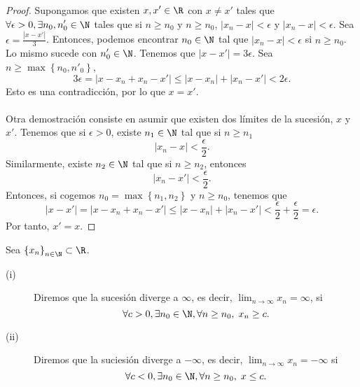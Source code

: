 \begin{proof}
	Supongamos que existen $\displaystyle x, x' \in \R $ con $\displaystyle x \neq x' $ tales que $\displaystyle \forall \epsilon > 0, \exists n_{0}, n'_{0} \in \N $ tales que si $\displaystyle n \geq n_{0}$ y $ n \geq n_{0} $, $\displaystyle \left|x_{n}-x\right| < \epsilon  $ y $\displaystyle \left|x_{n}-x\right|<\epsilon  $. Sea $\displaystyle \epsilon = \frac{ \left|x - x'\right|}{3} $. Entonces, podemos encontrar $\displaystyle n_{0} \in \N $ tal que $\displaystyle  \left|x_{n}-x\right| < \epsilon  $ si $\displaystyle n \geq n_{0} $. Lo mismo sucede con $\displaystyle n'_{0} \in \N $. Tenemos que $\displaystyle \left|x-x'\right| = 3 \epsilon $. Sea $\displaystyle n \geq \max \left\{ n_{0}, n'_{0}\right\}  $, 
	\[ 3 \epsilon = \left|x - x_{n} + x_{n}-x'\right| \leq \left|x - x_{n}\right| + \left|x_{n}-x'\right| < 2\epsilon .\]
	Esto es una contradicción, por lo que $\displaystyle x = x' $. \\ \\
Otra demostración consiste en asumir que existen dos límites de la sucesión, $\displaystyle x $ y $\displaystyle x' $. Tenemos que si $\displaystyle \epsilon > 0 $, existe $\displaystyle n_{1} \in \N $ tal que si $\displaystyle n \geq n_{1} $ 
\[ \left|x_{n}-x\right| < \frac{\epsilon }{2} .\]
Similarmente, existe $\displaystyle n_{2}\in\N $ tal que si $\displaystyle n \geq n_{2} $, entonces 
\[ \left|x_{n}-x'\right| < \frac{\epsilon }{2} .\]
Entonces, si cogemos $\displaystyle n_{0} = \max \left\{ n_{1}, n_{2}\right\}  $ y $\displaystyle n \geq n_{0} $, tenemos que 
\[ \left|x - x'\right| = \left|x - x_{n} + x_{n}- x'\right| \leq \left|x - x_{n}\right| + \left|x_{n}-x'\right| < \frac{\epsilon }{2} + \frac{\epsilon }{2} = \epsilon  .\]
Por tanto, $\displaystyle x' = x $.
\end{proof}

\begin{fdefinition}[]
\normalfont Sea $\displaystyle \left\{ x_{n}\right\}_{n\in\N} \subset \R$. 
\begin{description}
\item[(i)] Diremos que la sucesión diverge a $\displaystyle \infty $, es decir, $\displaystyle \lim_{n \to \infty}x_{n} = \infty $, si 
	\[\forall c>0, \exists n_{0} \in \N, \forall n \geq n_{0}, \; x_{n} \geq c .\]
\item[(ii)] Diremos que la suciesión diverge a $\displaystyle -\infty $, es decir, $\displaystyle \lim_{n \to \infty}x_{n} = - \infty $ si 
	\[\forall c < 0, \exists n_{0} \in \N, \forall n \geq n_{0}, \; x\leq c .\]
\end{description}
\end{fdefinition}


